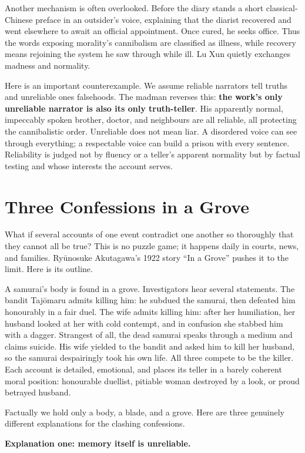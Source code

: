 Another mechanism is often overlooked. Before the diary stands a short classical-Chinese preface in an outsider's voice, explaining that the diarist recovered and went elsewhere to await an official appointment. Once cured, he seeks office. Thus the words exposing morality's cannibalism are classified as illness, while recovery means rejoining the system he saw through while ill. Lu Xun quietly exchanges madness and normality.

Here is an important counterexample. We assume reliable narrators tell truths and unreliable ones falsehoods. The madman reverses this: \textbf{the work's only unreliable narrator is also its only truth-teller}. His apparently normal, impeccably spoken brother, doctor, and neighbours are all reliable, all protecting the cannibalistic order. Unreliable does not mean liar. A disordered voice can see through everything; a respectable voice can build a prison with every sentence. Reliability is judged not by fluency or a teller's apparent normality but by factual testing and whose interests the account serves.

\section{Three Confessions in a Grove}
What if several accounts of one event contradict one another so thoroughly that they cannot all be true? This is no puzzle game; it happens daily in courts, news, and families. Ryūnosuke Akutagawa's 1922 story ``In a Grove'' pushes it to the limit. Here is its outline.

A samurai's body is found in a grove. Investigators hear several statements. The bandit Tajōmaru admits killing him: he subdued the samurai, then defeated him honourably in a fair duel. The wife admits killing him: after her humiliation, her husband looked at her with cold contempt, and in confusion she stabbed him with a dagger. Strangest of all, the dead samurai speaks through a medium and claims suicide. His wife yielded to the bandit and asked him to kill her husband, so the samurai despairingly took his own life. All three compete to be the killer. Each account is detailed, emotional, and places its teller in a barely coherent moral position: honourable duellist, pitiable woman destroyed by a look, or proud betrayed husband.

Factually we hold only a body, a blade, and a grove. Here are three genuinely different explanations for the clashing confessions.

\textbf{Explanation one: memory itself is unreliable.}

